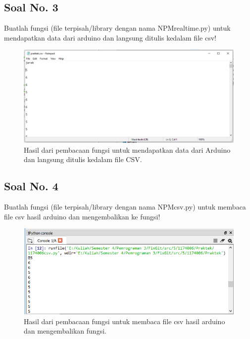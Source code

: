 \subsection{Soal No. 3}
Buatlah  fungsi  (file  terpisah/library  dengan  nama  NPMrealtime.py) untuk mendapatkan data dari arduino dan langsung ditulis kedalam file csv!


\begin{figure}[H]
	\includegraphics[width=12cm]{figures/5/1174006/Praktek/3.png}
	\centering
	\caption{Hasil dari pembacaan fungsi untuk mendapatkan data dari Arduino dan langsung ditulis kedalam file CSV.}
\end{figure}

\subsection{Soal No. 4}
Buatlah fungsi (file terpisah/library dengan nama NPMcsv.py) untuk membaca file csv hasil arduino dan mengembalikan ke fungsi!


\begin{figure}[H]
	\includegraphics[width=12cm]{figures/5/1174006/Praktek/4.png}
	\centering
	\caption{Hasil dari pembacaan fungsi untuk membaca file csv hasil arduino dan mengembalikan fungsi.}
\end{figure}

